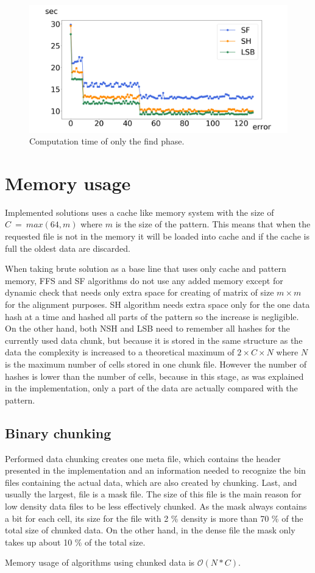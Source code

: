 \begin{figure}[h]
\centering
\includegraphics[width=\textwidth]{img/errorFind}
\caption{Computation time of only the find phase.}
\label{fig_errF}
\end{figure}

\section{Memory usage} \label{memoryuse}
Implemented solutions uses a cache like memory system with the size of $C~=~max(64, m)$ where $m$ is the size of the pattern. This means that when the requested file is not in the memory it will be loaded into cache and if the cache is full the oldest data are discarded. 

When taking brute solution as a base line that uses only cache and pattern memory, FFS and SF algorithms do not use any added memory except for dynamic check that needs only extra space for creating of matrix of size $m\times m$ for the alignment purposes. SH algorithm needs extra space only for the one data hash at a time and hashed all parts of the pattern so the increase is negligible. On the other hand, both NSH and LSB need to remember all hashes for the currently used data chunk, but because it is stored in the same structure as the data the complexity is increased to a theoretical maximum of $2\times C \times N$ where $N$ is the maximum number of cells stored in one chunk file. However the number of hashes is lower than the number of cells, because in this stage, as was explained in the implementation, only a part of the data are actually compared with the pattern.

\subsection{Binary chunking}
Performed data chunking creates one meta file, which contains the header presented in the implementation and an information needed to recognize the bin files containing the actual data, which are also created by chunking. Last, and usually the largest, file is a mask file. The size of this file is the main reason for low density data files to be less effectively chunked. As the mask always contains a bit for each cell, its size for the file with 2 \% density is more than 70 \% of the total size of chunked data. On the other hand, in the dense file the mask only takes up about 10 \% of the total size. 

Memory usage of algorithms using chunked data is $\mathcal{O}(N*C)$.